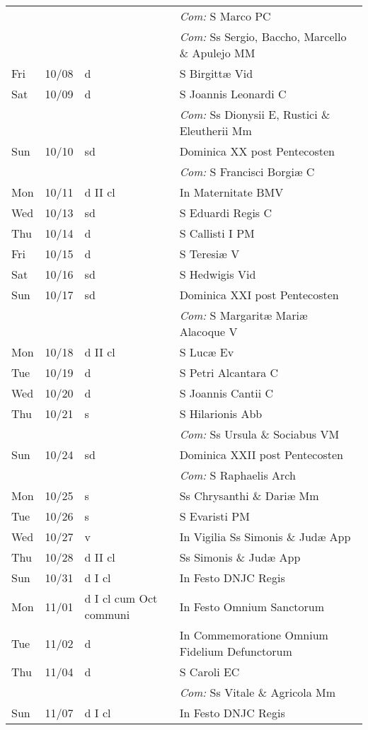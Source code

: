 \documentclass[10pt]{article}
\begin{document}
\begin{longtable}{ l l l l }
 & & & \textit{Com:} S Marco PC\\
 & & & \textit{Com:} Ss Sergio, Baccho, Marcello \& Apulejo MM\\
Fri & 10/08 & d & S Birgittæ Vid\\
Sat & 10/09 & d & S Joannis Leonardi C\\
 & & & \textit{Com:} Ss Dionysii E, Rustici \& Eleutherii Mm\\
Sun & 10/10 & sd & Dominica XX post Pentecosten\\
 & & & \textit{Com:} S Francisci Borgiæ C\\
Mon & 10/11 & d II cl & In Maternitate BMV\\
Wed & 10/13 & sd & S Eduardi Regis C\\
Thu & 10/14 & d & S Callisti I PM\\
Fri & 10/15 & d & S Teresiæ V\\
Sat & 10/16 & sd & S Hedwigis Vid\\
Sun & 10/17 & sd & Dominica XXI post Pentecosten\\
 & & & \textit{Com:} S Margaritæ Mariæ Alacoque V\\
Mon & 10/18 & d II cl & S Lucæ Ev\\
Tue & 10/19 & d & S Petri Alcantara C\\
Wed & 10/20 & d & S Joannis Cantii C\\
Thu & 10/21 & s & S Hilarionis Abb\\
 & & & \textit{Com:} Ss Ursula \& Sociabus VM\\
Sun & 10/24 & sd & Dominica XXII post Pentecosten\\
 & & & \textit{Com:} S Raphaelis Arch\\
Mon & 10/25 & s & Ss Chrysanthi \& Dariæ Mm\\
Tue & 10/26 & s & S Evaristi PM\\
Wed & 10/27 & v & In Vigilia Ss Simonis \& Judæ App\\
Thu & 10/28 & d II cl & Ss Simonis \& Judæ App\\
Sun & 10/31 & d I cl & In Festo DNJC Regis\\
Mon & 11/01 & d I cl cum Oct communi & In Festo Omnium Sanctorum\\
Tue & 11/02 & d & In Commemoratione Omnium Fidelium Defunctorum\\
Thu & 11/04 & d & S Caroli EC\\
 & & & \textit{Com:} Ss Vitale \& Agricola Mm\\
Sun & 11/07 & d I cl & In Festo DNJC Regis\\

\end{longtable}
\end{document}
